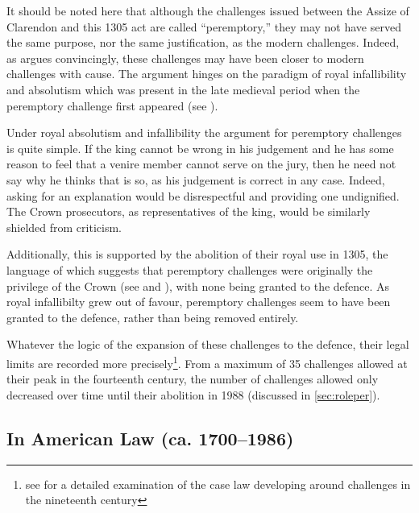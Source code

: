 It should be noted here that although the challenges issued between the Assize of Clarendon and this 1305 act are called
``peremptory,'' they may not have served the same purpose, nor the same justification, as the modern challenges. Indeed, as
\cite{hoffman1997} argues convincingly, these challenges may have been closer to modern challenges with cause. The argument hinges
on the paradigm of royal infallibility and absolutism which was present in the late medieval period when the peremptory challenge
first appeared (see \cite{burgess1992}).

Under royal absolutism and infallibility the argument for peremptory challenges is quite simple. If the king cannot be wrong in
his judgement and he has some reason to feel that a venire member cannot serve on the jury, then he need not say why he thinks
that is so, as his judgement is correct in any case. Indeed, asking for an explanation would be disrespectful and providing one
undignified. The Crown prosecutors, as representatives of the king, would be similarly shielded from criticism.

Additionally, this is supported by the abolition of their royal use in 1305, the language of which suggests that peremptory
challenges were originally the privilege of the Crown (see \cite{hoffman1997} and \cite{vandykejurysel}), with none being granted
to the defence. As royal infallibilty grew out of favour, peremptory challenges seem to have been granted to the defence, rather
than being removed entirely.

Whatever the logic of the expansion of these challenges to the defence, their legal limits are recorded more
precisely\footnote{see \cite{brown2000} for a detailed examination of the case law developing around challenges in the nineteenth
  century}. From a maximum of 35 challenges allowed at their peak in the fourteenth century, the number of challenges allowed only
decreased over time until their abolition in 1988 (discussed in \ref{sec:roleper}).

\subsection{In American Law (ca. 1700--1986)}

